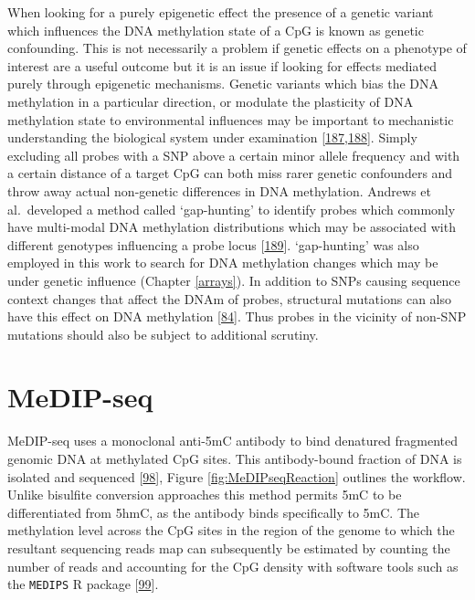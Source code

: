 \documentclass[
]{book}
\begin{document}
When looking for a purely epigenetic effect the presence of a genetic variant which influences the DNA methylation state of a CpG is known as genetic confounding.
This is not necessarily a problem if genetic effects on a phenotype of interest are a useful outcome but it is an issue if looking for effects mediated purely through epigenetic mechanisms.
Genetic variants which bias the DNA methylation in a particular direction, or modulate the plasticity of DNA methylation state to environmental influences may be important to mechanistic understanding the biological system under examination {[}\protect\hyperlink{ref-Birney2016}{187},\protect\hyperlink{ref-Lappalainen2017}{188}{]}.
Simply excluding all probes with a SNP above a certain minor allele frequency and with a certain distance of a target CpG can both miss rarer genetic confounders and throw away actual non-genetic differences in DNA methylation.
Andrews et al.~developed a method called `gap-hunting' to identify probes which commonly have multi-modal DNA methylation distributions which may be associated with different genotypes influencing a probe locus {[}\protect\hyperlink{ref-Andrews2016}{189}{]}.
`gap-hunting' was also employed in this work to search for DNA methylation changes which may be under genetic influence (Chapter \ref{arrays}).
In addition to SNPs causing sequence context changes that affect the DNAm of probes, structural mutations can also have this effect on DNA methylation {[}\protect\hyperlink{ref-Bell2017a}{84}{]}.
Thus probes in the vicinity of non-SNP mutations should also be subject to additional scrutiny.

\hypertarget{MeDIPseq}{%
\section{MeDIP-seq}\label{MeDIPseq}}

MeDIP-seq uses a monoclonal anti-5mC antibody to bind denatured fragmented genomic DNA at methylated CpG sites.
This antibody-bound fraction of DNA is isolated and sequenced {[}\protect\hyperlink{ref-Down2009}{98}{]}, Figure \ref{fig:MeDIPseqReaction} outlines the workflow.
Unlike bisulfite conversion approaches this method permits 5mC to be differentiated from 5hmC, as the antibody binds specifically to 5mC.
The methylation level across the CpG sites in the region of the genome to which the resultant sequencing reads map can subsequently be estimated by counting the number of reads and accounting for the CpG density with software tools such as the \texttt{MEDIPS} R package {[}\protect\hyperlink{ref-Lienhard2014}{99}{]}.
\end{document}
